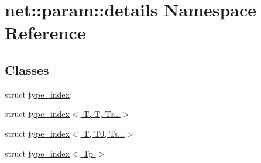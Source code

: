 \hypertarget{namespacenet_1_1param_1_1details}{\section{net\+:\+:param\+:\+:details Namespace Reference}
\label{namespacenet_1_1param_1_1details}
}
\subsection*{Classes}
\begin{DoxyCompactItemize}
\item 
struct \hyperlink{structnet_1_1param_1_1details_1_1type__index}{type\+\_\+index}
\item 
struct \hyperlink{structnet_1_1param_1_1details_1_1type__index_3_01T_00_01T_00_01Ts_8_8_8_4}{type\+\_\+index$<$ T, T, Ts...$>$}
\item 
struct \hyperlink{structnet_1_1param_1_1details_1_1type__index_3_01T_00_01T0_00_01Ts_8_8_8_4}{type\+\_\+index$<$ T, T0, Ts...$>$}
\item 
struct \hyperlink{structnet_1_1param_1_1details_1_1type__index_3_01Tp_01_4}{type\+\_\+index$<$ Tp $>$}
\end{DoxyCompactItemize}
